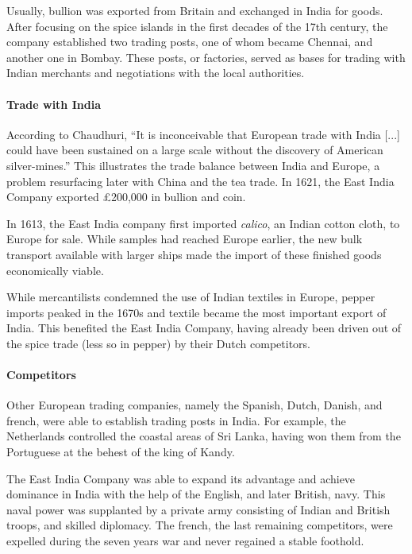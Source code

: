 \documentclass[11pt, a4paper, headings=standardclasses]{scrartcl}
\begin{document}
Usually, bullion was exported from Britain and exchanged in India for goods.\autocite[Section \textit{The commodity structure of trade}]{FT} After focusing on the spice islands in the first decades of the 17th century, the company established two trading posts, one of whom became Chennai, and another one in Bombay. These posts, or factories, served as bases for trading with Indian merchants and negotiations with the local authorities.\autocite{EIC}

\paragraph{Trade with India}
\label{balance}
According to Chaudhuri, ``It is inconceivable that European trade with India [...] could have been sustained on a large scale without the discovery of American silver-mines.''\autocite[395]{FT} This illustrates the trade balance between India and Europe, a problem resurfacing later with China and the tea trade. In 1621, the East India Company exported \pounds{}200,000 in bullion and coin.\autocite[398]{FT}

In 1613, the East India company first imported \textit{calico}, an Indian cotton cloth, to Europe for sale. While samples had reached Europe earlier, the new bulk transport available with larger ships made the import of these finished goods economically viable.\autocite[400]{FT, Calico}

While mercantilists condemned the use of Indian textiles in Europe, pepper imports peaked in the 1670s\autocite[399]{FT} and textile became the most important export of India. This benefited the East India Company, having already been driven out of the spice trade (less so in pepper) by their Dutch competitors.\autocite[401--407]{FT}

\paragraph{Competitors}

Other European trading companies, namely the Spanish, Dutch, Danish, and french, were able to establish trading posts in India. For example, the Netherlands controlled the coastal areas of Sri Lanka, having won them from the Portuguese at the behest of the king of Kandy.\autocite[Chapter 5]{dutch}

The East India Company was able to expand its advantage and achieve dominance in India with the help of the English, and later British, navy. This naval power was supplanted by a private army consisting of Indian and British troops, and skilled diplomacy.\autocite{ms} The french, the last remaining competitors, were expelled during the seven years war and never regained a stable foothold.\autocite[132-33]{RF} 
\end{document}

